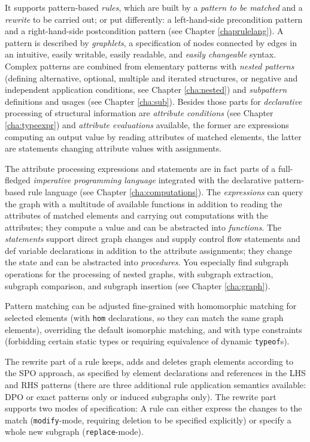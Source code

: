 It supports pattern-based \emph{rules}, which are built by a \emph{pattern to be matched} and a \emph{rewrite} to be carried out; or put differently: a left-hand-side precondition pattern and a right-hand-side postcondition pattern (see Chapter \ref{chaprulelang}).
A pattern is described by \emph{graphlets}, a specification of nodes connected by edges in an intuitive, easily writable, easily readable, and \emph{easily changeable} syntax.
Complex patterns are combined from elementary patterns with \emph{nested patterns} (defining alternative, optional, multiple and iterated structures, or negative and independent application conditions, see Chapter \ref{cha:nested}) and \emph{subpattern} definitions and usages (see Chapter \ref{cha:sub}).
Besides those parts for \emph{declarative} processing of structural information are \emph{attribute conditions} (see Chapter \ref{cha:typeexpr}) and \emph{attribute evaluations} available, the former are expressions computing an output value by reading attributes of matched elements, the latter are statements changing attribute values with assignments. 

The attribute processing expressions and statements are in fact parts of a full-fledged \emph{imperative programming language} integrated with the declarative pattern-based rule language (see Chapter \ref{cha:computations}).
The \emph{expressions} can query the graph with a multitude of available functions in addition to reading the attributes of matched elements and carrying out computations with the attributes; they compute a value and can be abstracted into \emph{functions}.
The \emph{statements} support direct graph changes and supply control flow statements and def variable declarations in addition to the attribute assignments; they change the state and can be abstracted into \emph{procedures}.
You especially find subgraph operations for the processing of nested graphs, with subgraph extraction, subgraph comparison, and subgraph insertion (see Chapter \ref{cha:graph}). 

Pattern matching can be adjusted fine-grained with homomorphic matching for selected elements (with \texttt{hom} declarations, so they can match the same graph elements), overriding the default isomorphic matching, and with type constraints (forbidding certain static types or requiring equivalence of dynamic \texttt{typeof}s).

The rewrite part of a rule keeps, adds and deletes graph elements according to the SPO approach, as specified by element declarations and references in the LHS and RHS patterns (there are three additional rule application semantics available: DPO or exact patterns only or induced subgraphs only).
The rewrite part supports two modes of specification: A rule can either express the changes to the match (\texttt{modify}-mode, requiring deletion to be specified explicitly) or specify a whole new subgraph (\texttt{replace}-mode).

